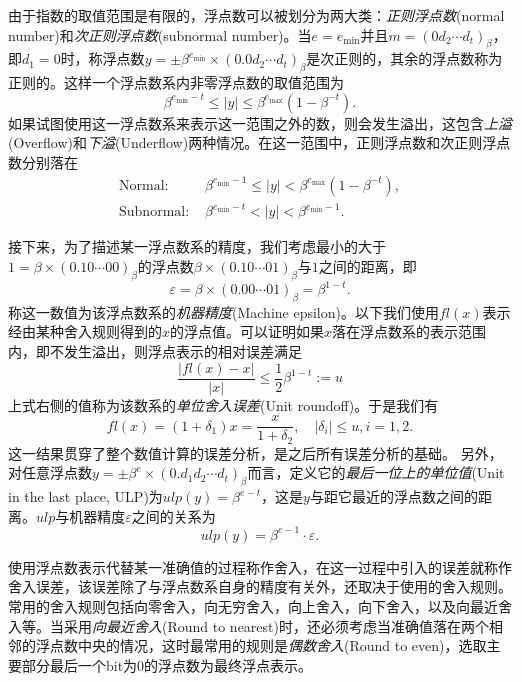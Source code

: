 \documentclass[a4paper,10pt]{ctexart}
\begin{document}
由于指数的取值范围是有限的，浮点数可以被划分为两大类：\emph{正则浮点数}(normal number)和\emph{次正则浮点数}(subnormal number)。当$ e = e_{\min} $并且$ m = (0d_2\cdots d_t)_\beta $，即$ d_1=0 $时，称浮点数$ y=\pm \beta^{e_{\min}}\times (0.0d_2\cdots d_t)_\beta $是次正则的，其余的浮点数称为正则的。这样一个浮点数系内非零浮点数的取值范围为
\begin{equation}
    \beta^{e_{\min}-t}\leqslant |y|\leqslant \beta^{e_{\max}}(1-\beta^{-t}).
\end{equation}
如果试图使用这一浮点数系来表示这一范围之外的数，则会发生溢出，这包含\emph{上溢}(Overflow)和\emph{下溢}(Underflow)两种情况。在这一范围中，正则浮点数和次正则浮点数分别落在
\[
    \begin{aligned}
        \text{Normal: } & \beta^{e_{\min}-1}\leqslant |y|<\beta^{e_{\max}}(1-\beta^{-t}),\\
        \text{Subnormal: } & \beta^{e_{\min}-t}<|y|<\beta^{e_{\min}-1}.
    \end{aligned}
\]

接下来，为了描述某一浮点数系的精度，我们考虑最小的大于$ 1= \beta\times (0.10\cdots00)_\beta $的浮点数$ \beta\times (0.10\cdots01)_\beta $与$ 1 $之间的距离，即
\begin{equation}
    \varepsilon = \beta\times (0.00\cdots01)_\beta = \beta^{1-t}.
\end{equation}
称这一数值为该浮点数系的\emph{机器精度}(Machine epsilon)。以下我们使用$ fl(x) $表示经由某种舍入规则得到的$ x $的浮点值。可以证明如果$ x $落在浮点数系的表示范围内，即不发生溢出，则浮点表示的相对误差满足
\begin{equation}
    \frac{|fl(x)-x|}{|x|}\leqslant \frac{1}{2}\beta^{1-t} :=u
\end{equation}
上式右侧的值称为该数系的\emph{单位舍入误差}(Unit roundoff)。于是我们有
\begin{equation}
    fl(x) = (1+\delta_1)x = \frac{x}{1+\delta_2},\quad |\delta_{i}|\leqslant u, i=1,2.
\end{equation}
这一结果贯穿了整个数值计算的误差分析，是之后所有误差分析的基础。
另外，对任意浮点数$ y=\pm \beta^e\times (0.d_1d_2\cdots d_t)_\beta $而言，定义它的\emph{最后一位上的单位值}(Unit in the last place, ULP)为$ ulp(y) = \beta^{e-t} $，这是$ y $与距它最近的浮点数之间的距离。$ ulp $与机器精度$ \varepsilon $之间的关系为
\begin{equation}
    ulp(y) = \beta^{e-1}\cdot\varepsilon.
\end{equation}

使用浮点数表示代替某一准确值的过程称作舍入，在这一过程中引入的误差就称作舍入误差，该误差除了与浮点数系自身的精度有关外，还取决于使用的舍入规则。常用的舍入规则包括向零舍入，向无穷舍入，向上舍入，向下舍入，以及向最近舍入等。当采用\emph{向最近舍入}(Round to nearest)时，还必须考虑当准确值落在两个相邻的浮点数中央的情况，这时最常用的规则是\emph{偶数舍入}(Round to even)，选取主要部分最后一个bit为0的浮点数为最终浮点表示。
\end{document}
